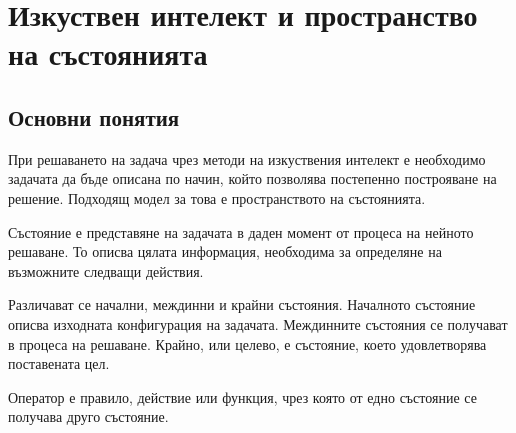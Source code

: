 \begin{konspekt}
\end{konspekt}

\section{Изкуствен интелект и пространство на състоянията}\label{s:25.1}

\subsection{Основни понятия}\label{s:25.1.1}

При решаването на задача чрез методи на изкуствения интелект е необходимо задачата да бъде описана по начин, който позволява постепенно построяване на решение. Подходящ модел за това е пространството на състоянията.

\begin{defn}[Състояние]
Състояние е представяне на задачата в даден момент от процеса на нейното решаване. То описва цялата информация, необходима за определяне на възможните следващи действия.
\end{defn}

Различават се начални, междинни и крайни състояния. Началното състояние описва изходната конфигурация на задачата. Междинните състояния се получават в процеса на решаване. Крайно, или целево, е състояние, което удовлетворява поставената цел.

\begin{defn}[Оператор]
Оператор е правило, действие или функция, чрез която от едно състояние се получава друго състояние.
\end{defn}

